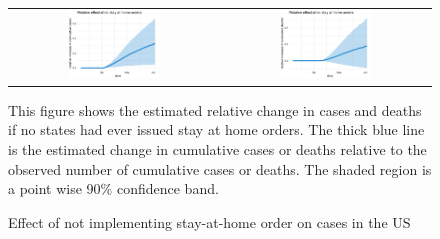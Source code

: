 \documentclass[11pt,reqno,letter]{amsart}
\theoremstyle{definition}
\begin{document}
\begin{figure}[ht]
  \caption{Effect  of  not implementing stay-at-home order on cases in the US  \label{fig:US-shelter-dgrowth}}
  \begin{minipage}{\linewidth}
    \centering
    \begin{tabular}{cc}
         \includegraphics[width=0.45\textwidth]{tables_and_figures/us-shelter-rcumu_idx}
      &
        \includegraphics[width=0.45\textwidth]{tables_and_figures/us-shelter-rcumu_deaths_idx}
    \end{tabular}
    \begin{flushleft}
      \footnotesize This figure shows the estimated relative change in
      cases and deaths if no states had ever issued stay at home
      orders. The thick blue line is the estimated change in cumulative
      cases or deaths relative to the observed number of cumulative cases
      or deaths. The shaded region is a point wise 90\% confidence
      band.
    \end{flushleft}
  \end{minipage}
\end{figure}




\end{document}
